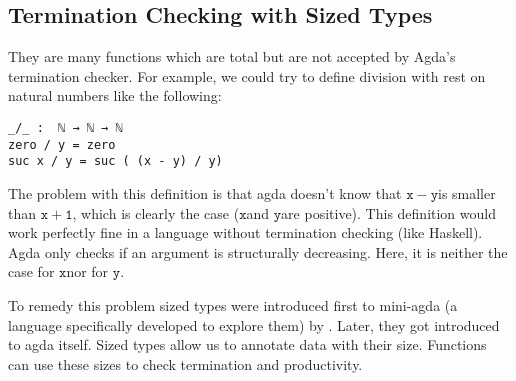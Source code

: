\documentclass[a4paper,cleardoubleempty,BCOR1cm]{scrbook}
\begin{document}
\subsection{Termination Checking with Sized Types}
\label{sec:org05644cd}
They are many functions which are total but are not accepted by Agda's
termination checker.  For example, we could try to define  division with
rest on natural numbers like the following:

\begin{verbatim}
_/_ :  ℕ → ℕ → ℕ
zero / y = zero
suc x / y = suc ( (x - y) / y)
\end{verbatim}

The problem with this definition is that agda doesn't know that $\mathtt{x-y}$\;is
smaller than $\mathtt{x+1}$, which is clearly the case ($\mathtt{x}$\;and $\mathtt{y}$\;are positive).  This
definition would work perfectly fine in a language without termination
checking (like Haskell).  Agda only checks if an argument is structurally
decreasing.  Here, it is neither the case for $\mathtt{x}$\;nor for $\mathtt{y}$.

To remedy this problem sized types were introduced first to mini-agda (a
language specifically developed to explore them) by \cite{abel2010miniagda}.
Later, they got introduced to agda itself. Sized types allow us to annotate data
with their size. Functions can use these sizes to check termination and
productivity.
\end{document}
